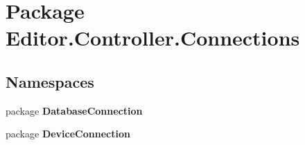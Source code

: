 \section{Package Editor.\-Controller.\-Connections}
\label{namespace_editor_1_1_controller_1_1_connections}
\subsection*{Namespaces}
\begin{DoxyCompactItemize}
\item 
package {\bf Database\-Connection}
\item 
package {\bf Device\-Connection}
\end{DoxyCompactItemize}

